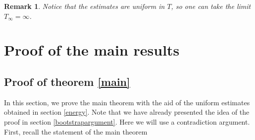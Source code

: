 \documentclass{amsart}
\newtheorem{remark}{Remark}
\begin{document}
\begin{remark}
 Notice that the estimates are uniform in $T$, so one can take the limit $T_{\infty}=\infty$.   
\end{remark}

\section{Proof of the main results}
\label{mainproof}
\subsection{Proof of theorem \ref{main}}
\label{proof1}
\noindent In this section, we prove the main theorem with the aid of the uniform estimates obtained in section \ref{energy}. Note that we have already presented the idea of the proof in section \ref{bootstrapargument}. Here we will use a contradiction argument. First, recall the statement of the main theorem 
\end{document}
